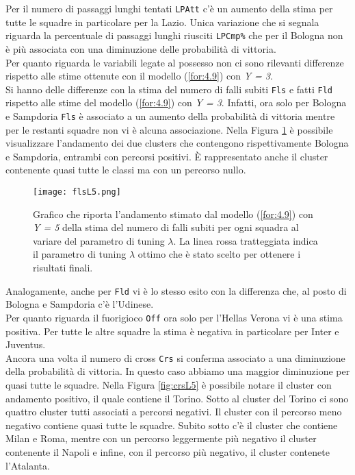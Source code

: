 Per il numero di passaggi lunghi tentati \texttt{LPAtt} c'è un aumento della stima per tutte le squadre in particolare per la Lazio. Unica variazione che si segnala riguarda la percentuale di passaggi lunghi riusciti \texttt{LPCmp\%} che per il Bologna non è più associata con una diminuzione delle probabilità di vittoria.\\
Per quanto riguarda le variabili legate al possesso non ci sono rilevanti differenze rispetto alle stime ottenute con il modello (\ref{for:4.9}) con \emph{Y = 3}.\\
Si hanno delle differenze con la stima del numero di falli subiti \texttt{Fls} e fatti \texttt{Fld} rispetto alle stime del modello (\ref{for:4.9}) con \emph{Y = 3}. Infatti, ora solo per Bologna e Sampdoria \texttt{Fls} è associato a un aumento della probabilità di vittoria mentre per le restanti squadre non vi è alcuna associazione. Nella Figura \ref{fig:flsL5} è possibile visualizzare l'andamento dei due clusters che contengono rispettivamente Bologna e Sampdoria, entrambi con percorsi positivi. È rappresentato anche il cluster contenente quasi tutte le classi ma con un percorso nullo.
\begin{figure}[htbp]
	\begin{center}
		\texttt{[image: flsL5.png]}
		\caption{Grafico che riporta l'andamento stimato dal modello (\ref{for:4.9}) con \emph{Y = 5} della stima del numero di falli subiti per ogni squadra al variare del parametro di tuning $\lambda$. La linea rossa tratteggiata indica il parametro di tuning $\lambda$ ottimo che è stato scelto per ottenere i risultati finali.} \label{fig:flsL5}
	\end{center}
\end{figure}
Analogamente, anche per \texttt{Fld} vi è lo stesso esito con la differenza che, al posto di Bologna e Sampdoria c'è l'Udinese.\\
Per quanto riguarda il fuorigioco \texttt{Off} ora solo per l'Hellas Verona vi è una stima positiva. Per tutte le altre squadre la stima è negativa in particolare per Inter e Juventus.\\
Ancora una volta il numero di cross \texttt{Crs} si conferma associato a una diminuzione della probabilità di vittoria. In questo caso abbiamo una maggior diminuzione per quasi tutte le squadre. Nella Figura \ref{fig:crsL5} è possibile notare il cluster con andamento positivo, il quale contiene il Torino. Sotto al cluster del Torino ci sono quattro cluster tutti associati a percorsi negativi. Il cluster con il percorso meno negativo contiene quasi tutte le squadre. Subito sotto c'è il cluster che contiene Milan e Roma, mentre con un percorso leggermente più negativo il cluster contenente il Napoli e infine, con il percorso più negativo, il cluster contenete l'Atalanta.
